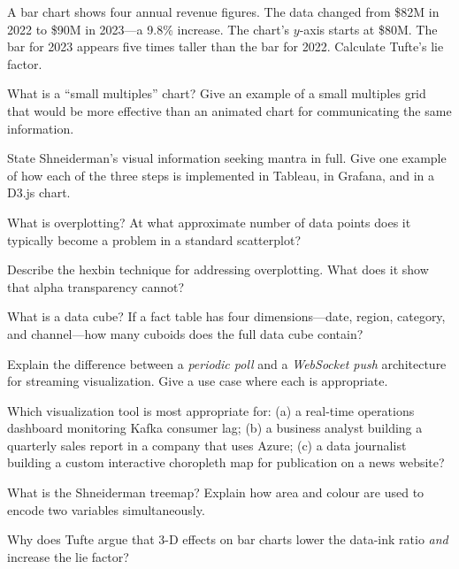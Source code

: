 \sq A bar chart shows four annual revenue figures. The data changed from
\$82M in 2022 to \$90M in 2023---a 9.8\% increase. The chart's $y$-axis
starts at \$80M. The bar for 2023 appears five times taller than the
bar for 2022. Calculate Tufte's lie factor.

\sq What is a ``small multiples'' chart? Give an example of a small
multiples grid that would be more effective than an animated chart for
communicating the same information.

\sq State Shneiderman's visual information seeking mantra in full.
Give one example of how each of the three steps is implemented in Tableau,
in Grafana, and in a D3.js chart.

\sq What is overplotting? At what approximate number of data points does
it typically become a problem in a standard scatterplot?

\sq Describe the hexbin technique for addressing overplotting. What does
it show that alpha transparency cannot?

\sq What is a data cube? If a fact table has four dimensions---date,
region, category, and channel---how many cuboids does the full data
cube contain?

\sq Explain the difference between a \emph{periodic poll} and a
\emph{WebSocket push} architecture for streaming visualization. Give
a use case where each is appropriate.

\sq Which visualization tool is most appropriate for: (a) a real-time
operations dashboard monitoring Kafka consumer lag; (b) a business analyst
building a quarterly sales report in a company that uses Azure; (c) a data
journalist building a custom interactive choropleth map for publication
on a news website?

\sq What is the Shneiderman treemap? Explain how area and colour are
used to encode two variables simultaneously.

\sq Why does Tufte argue that 3-D effects on bar charts lower the
data-ink ratio \emph{and} increase the lie factor?


